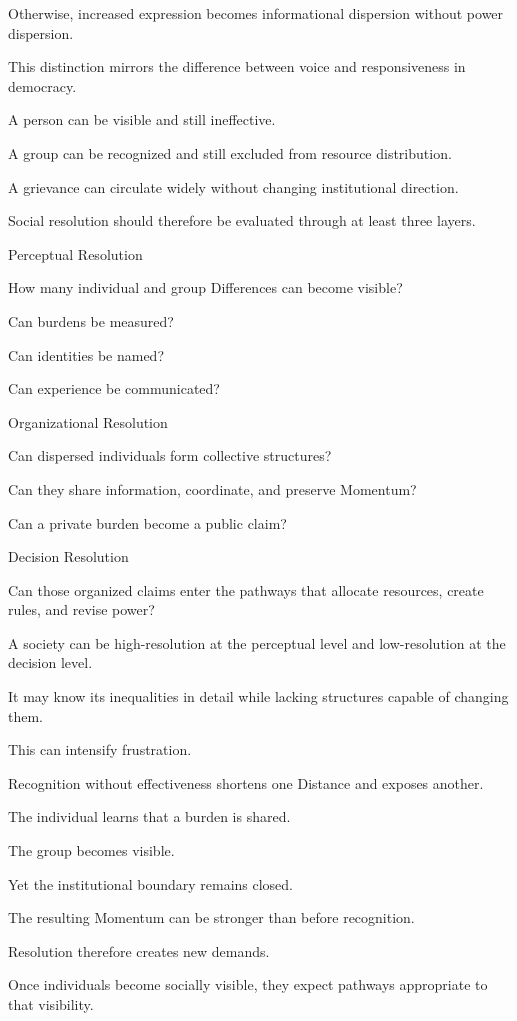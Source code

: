 Otherwise, increased expression becomes informational dispersion without power dispersion.

This distinction mirrors the difference between voice and responsiveness in democracy.

A person can be visible and still ineffective.

A group can be recognized and still excluded from resource distribution.

A grievance can circulate widely without changing institutional direction.

Social resolution should therefore be evaluated through at least three layers.

Perceptual Resolution

How many individual and group Differences can become visible?

Can burdens be measured?

Can identities be named?

Can experience be communicated?

Organizational Resolution

Can dispersed individuals form collective structures?

Can they share information, coordinate, and preserve Momentum?

Can a private burden become a public claim?

Decision Resolution

Can those organized claims enter the pathways that allocate resources, create rules, and revise power?

A society can be high-resolution at the perceptual level and low-resolution at the decision level.

It may know its inequalities in detail while lacking structures capable of changing them.

This can intensify frustration.

Recognition without effectiveness shortens one Distance and exposes another.

The individual learns that a burden is shared.

The group becomes visible.

Yet the institutional boundary remains closed.

The resulting Momentum can be stronger than before recognition.

Resolution therefore creates new demands.

Once individuals become socially visible, they expect pathways appropriate to that visibility.

